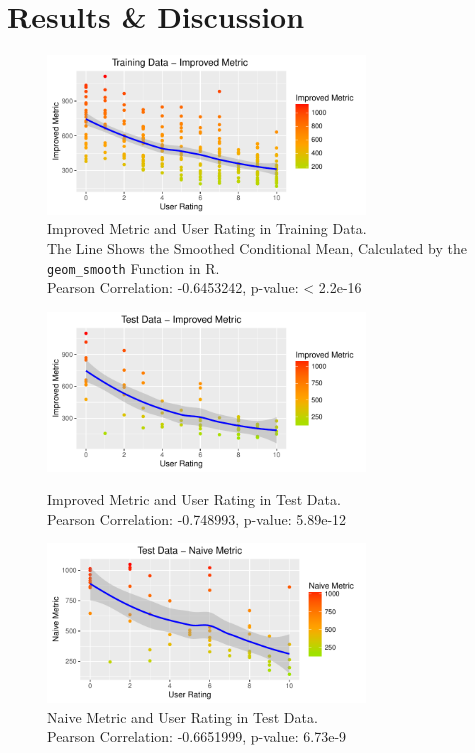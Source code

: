 \documentclass[headsepline,footsepline,footinclude=false,oneside,fontsize=11pt,paper=a4,listof=totoc,bibliography=totoc]{scrbook} %
\begin{document}
\section{Results \& Discussion}

\begin{figure}[b]
\centering
\includegraphics[width=8.45cm]{TrainingDataImproved}
\vspace{-20pt}
\caption{Improved Metric and User Rating in Training Data. \\
The Line Shows the Smoothed Conditional Mean, Calculated by the \texttt{geom\_smooth} Function in R. \\
Pearson Correlation: -0.6453242, p-value: < 2.2e-16}
\label{fig:trainingData}
\vspace{-10pt}
\end{figure}

\begin{figure}[t]
\centering
\includegraphics[width=8.45cm]{TestDataImproved}
\vspace{-20pt}
\caption{Improved Metric and User Rating in Test Data.\\
Pearson Correlation: -0.748993, p-value: 5.89e-12}
\label{fig:testData}

\includegraphics[width=8.45cm]{TestDataNaive}
\vspace{-20pt}
\caption{Naive Metric and User Rating in Test Data.\\
Pearson Correlation: -0.6651999, p-value: 6.73e-9}
\label{fig:testDataNaive}
\vspace{-10pt}
\end{figure}
\end{document}

